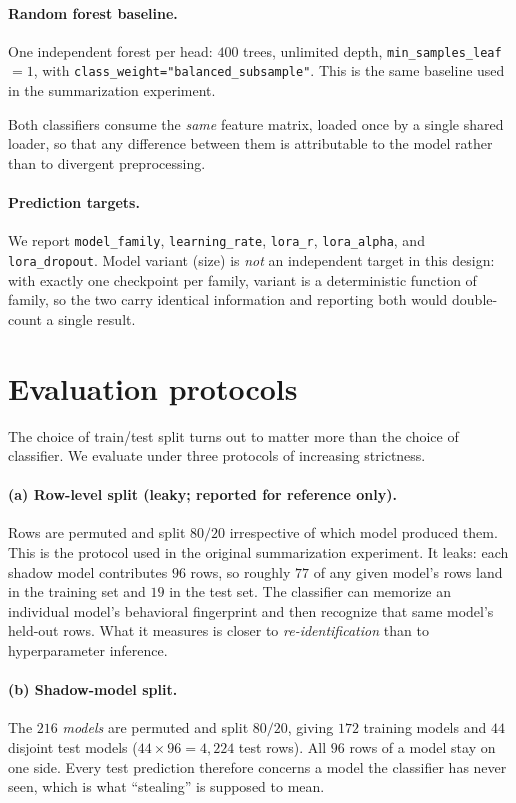 \documentclass[11pt]{article}
\newcommand{\hd}[1]{\texttt{#1}}
\begin{document}
\paragraph{Random forest baseline.} One independent forest per head: $400$ trees,
unlimited depth, \texttt{min\_samples\_leaf}$=1$, with
\texttt{class\_weight="balanced\_subsample"}. This is the same baseline used in the
summarization experiment.

Both classifiers consume the \emph{same} feature matrix, loaded once by a single shared
loader, so that any difference between them is attributable to the model rather than to
divergent preprocessing.

\paragraph{Prediction targets.} We report \hd{model\_family}, \hd{learning\_rate},
\hd{lora\_r}, \hd{lora\_alpha}, and \hd{lora\_dropout}. Model variant (size) is
\emph{not} an independent target in this design: with exactly one checkpoint per family,
variant is a deterministic function of family, so the two carry identical information and
reporting both would double-count a single result.

\section{Evaluation protocols}
\label{sec:protocols}

The choice of train/test split turns out to matter more than the choice of classifier. We
evaluate under three protocols of increasing strictness.

\paragraph{(a) Row-level split (leaky; reported for reference only).} Rows are permuted and
split $80/20$ irrespective of which model produced them. This is the protocol used in the
original summarization experiment. It leaks: each shadow model contributes $96$ rows, so
roughly $77$ of any given model's rows land in the training set and $19$ in the test set.
The classifier can memorize an individual model's behavioral fingerprint and then
recognize that same model's held-out rows. What it measures is closer to
\emph{re-identification} than to hyperparameter inference.

\paragraph{(b) Shadow-model split.} The $216$ \emph{models} are permuted and split $80/20$,
giving $172$ training models and $44$ disjoint test models ($44 \times 96 = 4{,}224$ test
rows). All $96$ rows of a model stay on one side. Every test prediction therefore concerns
a model the classifier has never seen, which is what ``stealing'' is supposed to mean.
\end{document}
